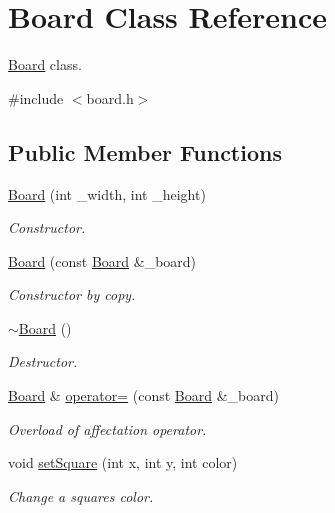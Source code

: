 \hypertarget{class_board}{}\section{Board Class Reference}
\label{class_board}


\hyperlink{class_board}{Board} class.  




{\ttfamily \#include $<$board.\+h$>$}

\subsection*{Public Member Functions}
\begin{DoxyCompactItemize}
\item 
\hyperlink{class_board_a815539526352256b76c07aaeb633dbb7}{Board} (int \+\_\+width, int \+\_\+height)
\begin{DoxyCompactList}\small\item\em Constructor. \end{DoxyCompactList}\item 
\hyperlink{class_board_a467d2914714aa66a5b29e963ea4bf30b}{Board} (const \hyperlink{class_board}{Board} \&\+\_\+board)
\begin{DoxyCompactList}\small\item\em Constructor by copy. \end{DoxyCompactList}\item 
\hyperlink{class_board_af73f45730119a1fd8f6670f53f959e68}{$\sim$\+Board} ()
\begin{DoxyCompactList}\small\item\em Destructor. \end{DoxyCompactList}\item 
\hyperlink{class_board}{Board} \& \hyperlink{class_board_ac67493bc18a85bffd6d31b294e0298b9}{operator=} (const \hyperlink{class_board}{Board} \&\+\_\+board)
\begin{DoxyCompactList}\small\item\em Overload of affectation operator. \end{DoxyCompactList}\item 
void \hyperlink{class_board_a0380aba58e451b88ec206e253083e049}{set\+Square} (int x, int y, int color)
\begin{DoxyCompactList}\small\item\em Change a square\textquotesingle{}s color. \end{DoxyCompactList}\item 

\end{DoxyCompactItemize}
